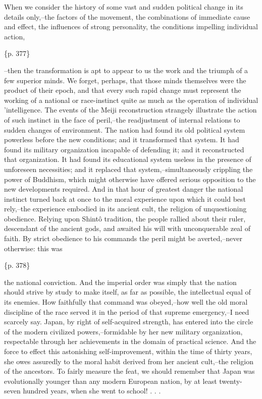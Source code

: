 When we consider the history of some vast and sudden political change in its details only,--the factors of the movement, the combinations of immediate cause and effect, the influences of strong personality, the conditions impelling individual action,

\{p. 377\}

--then the transformation is apt to appear to us the work and the triumph of a few superior minds. We forget, perhaps, that those minds themselves were the product of their epoch, and that every such rapid change must represent the working of a national or race-instinct quite as much as the operation of individual 'intelligence. The events of the Meiji reconstruction strangely illustrate the action of such instinct in the face of peril,--the readjustment of internal relations to sudden changes of environment. The nation had found its old political system powerless before the new conditions; and it transformed that system. It had found its military organization incapable of defending it; and it reconstructed that organization. It had found its educational system useless in the presence of unforeseen necessities; and it replaced that system,--simultaneously crippling the power of Buddhism, which might otherwise have offered serious opposition to the new developments required. And in that hour of greatest danger the national instinct turned back at once to the moral experience upon which it could best rely,--the experience embodied in its ancient cult, the religion of unquestioning obedience. Relying upon Shintô tradition, the people rallied about their ruler, descendant of the ancient gods, and awaited his will with unconquerable zeal of faith. By strict obedience to his commands the peril might be averted,--never otherwise: this was

\{p. 378\}

the national conviction. And the imperial order was simply that the nation should strive by study to make itself, as far as possible, the intellectual equal of its enemies. How faithfully that command was obeyed,--how well the old moral discipline of the race served it in the period of that supreme emergency,--I need scarcely say. Japan, by right of self-acquired strength, has entered into the circle of the modern civilized powers,--formidable by her new military organization, respectable through her achievements in the domain of practical science. And the force to effect this astonishing self-improvement, within the time of thirty years, she owes assuredly to the moral habit derived from her ancient cult,--the religion of the ancestors. To fairly measure the feat, we should remember that Japan was evolutionally younger than any modern European nation, by at least twenty-seven hundred years, when she went to school! . . .



